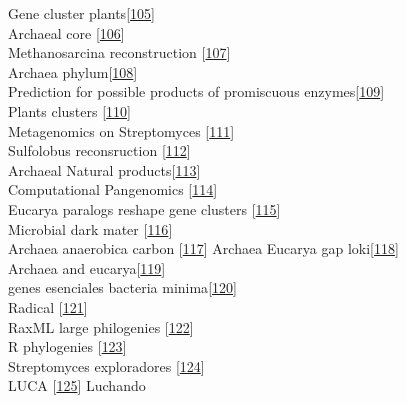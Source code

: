 \documentclass[12pt,twoside]{reedthesis}
\begin{document}
  Gene cluster
  plants{[}\protect\hyperlink{ref-osbourn_gene_2010}{105}{]}\\
  Archaeal core
  {[}\protect\hyperlink{ref-makarova_comparative_1999}{106}{]}\\
  Methanosarcina reconstruction
  {[}\protect\hyperlink{ref-benedict_genome-scale_2012}{107}{]}\\
  Archaea phylum{[}\protect\hyperlink{ref-seitz_genomic_2016}{108}{]}\\
  Prediction for possible products of promiscuous
  enzymes{[}\protect\hyperlink{ref-jeffryes_mines_2015}{109}{]}\\
  Plants clusters
  {[}\protect\hyperlink{ref-medema_computational_2016}{110}{]}\\
  Metagenomics on Streptomyces
  {[}\protect\hyperlink{ref-iqbal_natural_2016}{111}{]}\\
  Sulfolobus reconsruction
  {[}\protect\hyperlink{ref-ulas_genome-scale_2012}{112}{]}\\
  Archaeal Natural
  products{[}\protect\hyperlink{ref-charlesworth_untapped_2015}{113}{]}\\
  Computational Pangenomics
  {[}\protect\hyperlink{ref-computational_pan-genomics_consortium_computational_2016}{114}{]}\\
  Eucarya paralogs reshape gene clusters
  {[}\protect\hyperlink{ref-chan_remodelling_2015}{115}{]}\\
  Microbial dark mater
  {[}\protect\hyperlink{ref-rinke_insights_2013}{116}{]}\\
  Archaea anaerobica carbon
  {[}\protect\hyperlink{ref-castelle_genomic_2015}{117}{]} Archaea Eucarya
  gap loki{[}\protect\hyperlink{ref-spang_complex_2015}{118}{]}\\
  Archaea and
  eucarya{[}\protect\hyperlink{ref-koonin_archaeal_2015}{119}{]}\\
  genes esenciales bacteria
  minima{[}\protect\hyperlink{ref-glass_essential_2006}{120}{]}\\
  Radical {[}\protect\hyperlink{ref-narechania_random_2012}{121}{]}\\
  RaxML large philogenies
  {[}\protect\hyperlink{ref-stamatakis_raxml_2014}{122}{]}\\
  R phylogenies
  {[}\protect\hyperlink{ref-phyloseq_powerful_2016}{123}{]}\\
  Streptomyces exploradores
  {[}\protect\hyperlink{ref-zacharia_exploring_2017}{124}{]}\\
  LUCA {[}\protect\hyperlink{ref-woese_universal_1998}{125}{]} Luchando
\end{document}

